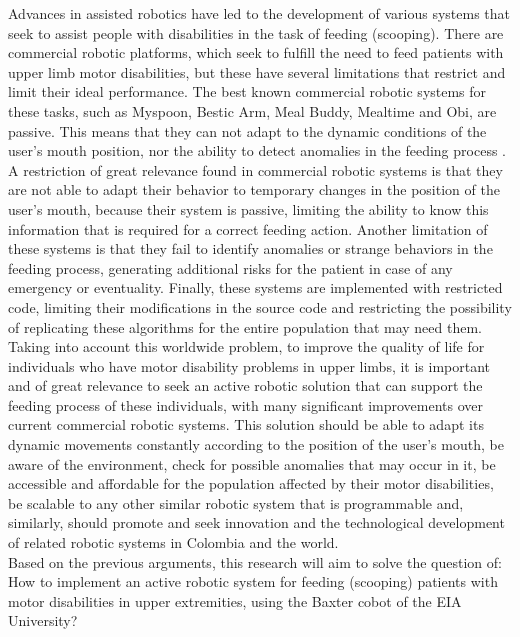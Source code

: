 \documentclass[11pt]{report} %
\begin{document}
Advances in assisted robotics have led to the development of various systems that seek to assist people with disabilities in the task of feeding (scooping). There are commercial robotic platforms, which seek to fulfill the need to feed patients with upper limb motor disabilities, but these have several limitations that restrict and limit their ideal performance. The best known commercial robotic systems for these tasks, such as Myspoon, Bestic Arm, Meal Buddy, Mealtime and Obi, are passive. This means that they can not adapt to the dynamic conditions of the user's mouth position, nor the ability to detect anomalies in the feeding process \citep{cite_park_active_robot_assisted_feeding}.\\

A restriction of great relevance found in commercial robotic systems is that they are not able to adapt their behavior to temporary changes in the position of the user's mouth, because their system is passive, limiting the ability to know this information that is required for a correct feeding action. Another limitation of these systems is that they fail to identify anomalies or strange behaviors in the feeding process, generating additional risks for the patient in case of any emergency or eventuality. Finally, these systems are implemented with restricted code, limiting their modifications in the source code and restricting the possibility of replicating these algorithms for the entire population that may need them.\\

Taking into account this worldwide problem, to improve the quality of life for individuals who have motor disability problems in upper limbs, it is important and of great relevance to seek an active robotic solution that can support the feeding process of these individuals, with many significant improvements over current commercial robotic systems. This solution should be able to adapt its dynamic movements constantly according to the position of the user's mouth, be aware of the environment, check for possible anomalies that may occur in it, be accessible and affordable for the population affected by their motor disabilities, be scalable to any other similar robotic system that is programmable and, similarly, should promote and seek innovation and the technological development of related robotic systems in Colombia and the world.\\

Based on the previous arguments, this research will aim to solve the question of:
How to implement an active robotic system for feeding (scooping) patients with motor disabilities in upper extremities, using the Baxter cobot of the EIA University?\\
\end{document}
